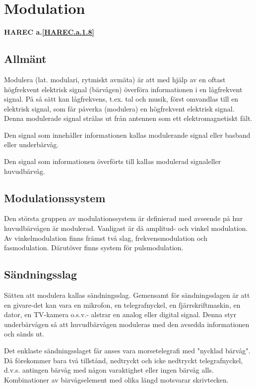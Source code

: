 \section{Modulation}
\textbf{HAREC a.\ref{HAREC.a.1.8}\label{myHAREC.a.1.8}}

\subsection{Allmänt}

Modulera (lat. modulari, rytmiskt avmäta) är att med hjälp av en oftast högfrekvent
elektrisk signal (bärvågen) överföra informationen i en lågfrekvent signal. På så sätt kan
lågfrekvens, t.ex. tal och musik, först omvandlas till en elektrisk signal, som får 
påverka (modulera) en högfrekvent elektrisk signal. Denna modulerade signal strålas ut från
antennen som ett elektromagnetiskt fält.

Den signal som innehåller informationen kallas modulerande signal eller basband eller
underbärvåg.

Den signal som informationen överförts till kallas modulerad signaleller huvudbärvåg.

\subsection{Modulationssystem}

Den största gruppen av modulationssystem är definierad med avseende på hur huvudbärvågen är
modulerad. Vanligast är då amplitud- och vinkel modulation. Av vinkelmodulation finns
främst två slag, frekvensmodulation och fasmodulation. Därutöver finns system för
pulsmodulation.

\subsection{Sändningsslag}

Sätten att modulera kallas sändningsslag. Gemensamt för sändningsslagen är att en
givare-det kan vara en mikrofon, en telegrafnyckel, en fjärrskriftmaskin, en dator, en
TV-kamera o.s.v.- alstrar en analog eller digital signal. Denna styr underbärvågen så att
huvudbärvågen moduleras med den avsedda informationen och sänds ut.

Det enklaste sändningsslaget får anses vara morsetelegrafi med "nycklad bärvåg".
Då förekommer bara två tillstånd, nedtryckt och icke nedtryckt telegrafnyckel, d.v.s.
antingen bärvåg med någon varaktighet eller ingen bärvåg alls. Kombinationer av
bärvågselement med olika längd motsvarar skrivtecken.

